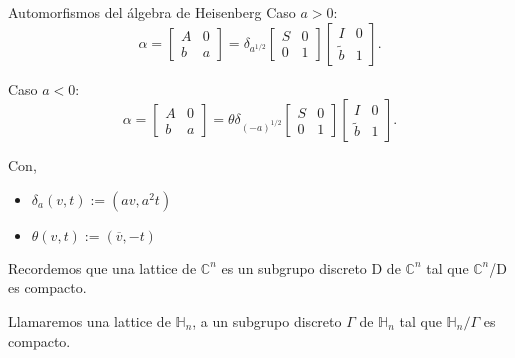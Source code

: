 \documentclass{beamer}
\begin{document}
\begin{frame}{Automorfismos del álgebra de Heisenberg}
Caso $a>0$:
 $$\alpha=
 \begin{bmatrix}
A & 0\\
b & a
\end{bmatrix}=
\delta_{a^{1/2}}
\begin{bmatrix}
S & 0\\
0 & 1
\end{bmatrix}
\begin{bmatrix}
I & 0\\
\tilde{b} & 1
\end{bmatrix}.
$$

Caso $a<0$:
$$\alpha=
 \begin{bmatrix}
A & 0\\
b & a
\end{bmatrix}=
\theta
\delta_{(-a)^{1/2}}
\begin{bmatrix}
S & 0\\
0 & 1
\end{bmatrix}
\begin{bmatrix}
I & 0\\
\tilde{b} & 1
\end{bmatrix}.
$$

Con, 
\begin{itemize}
\item $\delta_a (v,t) :=(a v,a^2 t)$
\item $\theta(v,t):=(\overline{v},-t)$
\end{itemize}
\end{frame}

\begin{frame}
 \begin{definition}
 Recordemos que una lattice de $\mathbb{C}^n$ es un subgrupo discreto D de $\mathbb{C}^n$ tal que $\mathbb{C}^n$/D es compacto.
\end{definition}

\begin{definition}
 Llamaremos una lattice de $\mathbb{H}_n$, a un subgrupo discreto $\Gamma$ de $\mathbb{H}_n$ tal que $\mathbb{H}_n/\Gamma$ es compacto.
\end{definition}

\end{frame}
\end{document}
